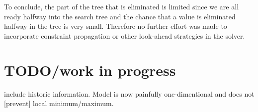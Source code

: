 To conclude, the part of the tree that is eliminated is limited since we are all ready halfway into the search tree and the chance that a value is eliminated halfway in the tree is very small. Therefore no further effort was made to incorporate constraint propagation or other look-ahead strategies in the solver.

\section*{TODO/work in progress}
include historic information. Model is now painfully one-dimentional and does not [prevent] local minimum/maximum.
	









